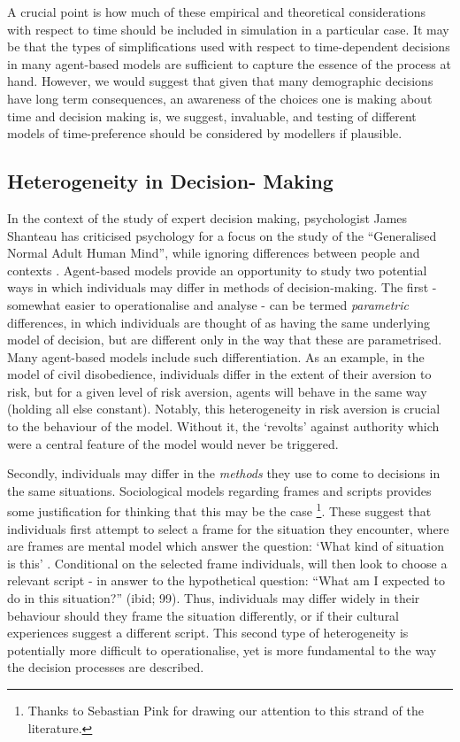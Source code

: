 \documentclass{article}
\begin{document}
A crucial point is how much of these empirical and theoretical considerations with respect to time should be included in simulation in a particular case. It may be that the types of simplifications used with respect to time-dependent decisions in many agent-based models are sufficient to capture the essence of the process at hand. However, we would suggest that given that many demographic decisions have long term consequences, an awareness of the choices one is making about time and decision making is, we suggest, invaluable, and testing of different models of time-preference should be considered by modellers if plausible.



\subsection{Heterogeneity in Decision-
Making}\label{heterogeneity-in-decision-strategies}

In the context of the study of expert decision making, psychologist James Shanteau has criticised psychology for a focus on the study of the ``Generalised Normal Adult Human Mind'', while ignoring differences between people and contexts \citep{Shanteau2015}. Agent-based models provide an opportunity to study two potential ways in which individuals may differ in methods of decision-making. The first - somewhat easier to operationalise and analyse - can be termed \emph{parametric} differences, in which individuals are thought of as having the same underlying model of decision, but are different only in the way that these are parametrised. Many agent-based models include such differentiation. As an example, in the \citet{Epstein2002} model of civil disobedience, individuals differ in the extent of their aversion to risk, but for a given level of risk aversion, agents will behave in the same way (holding all else constant). Notably, this heterogeneity in risk aversion is crucial to the behaviour of the model. Without it, the `revolts' against authority which were a central feature of the model would never be triggered.

Secondly, individuals may differ in the \emph{methods} they use to come to decisions in the same situations. Sociological models regarding frames and scripts provides some justification for thinking that this may be the case \citep{Kronenberg2014}\footnote{Thanks to Sebastian Pink for drawing our attention to this strand of the literature.}. These suggest that individuals first attempt to select a frame for the situation they encounter, where are frames are mental model which answer the question: `What kind of situation is this' . Conditional on the selected frame individuals, will then look to choose a relevant script - in answer to the hypothetical question: ``What am I expected to do in this situation?'' (ibid; 99). Thus, individuals may differ widely in their behaviour should they frame the situation differently, or if their cultural experiences suggest a different script.  This second type of heterogeneity is potentially more difficult to operationalise, yet is more fundamental to the way the decision processes are described.
\end{document}
